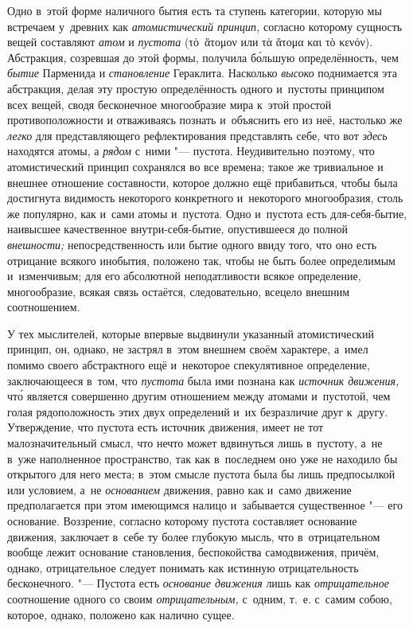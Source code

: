 
Одно в~этой форме наличного бытия есть та ступень категории, которую мы
встречаем у~древних как {\em атомистический принцип,}
согласно которому сущность вещей составляют {\em атом} и {\em пустота}
(\textgreek{τὸ~ἅτομον} или \textgreek{τὰ ἅτομα και τὸ κενόν}).
Абстракция, созревшая до этой формы, получила б\'{о}льшую определённость, чем
{\em бытие} Парменида и {\em становление} Гераклита. Насколько
{\em высоко} поднимается эта абстракция, делая эту
простую определённость одного и~пустоты принципом всех вещей, сводя
бесконечное многообразие мира к~этой простой противоположности и
отваживаясь познать и~объяснить его из неё, настолько же
{\em легко} для представляющего рефлектирования
представлять себе, что вот {\em здесь} находятся атомы,
а {\em рядом} с~ними "--- пустота. Неудивительно поэтому,
что атомистический принцип сохранялся во все времена; такое же тривиальное
и внешнее отношение составности, которое должно ещё прибавиться, чтобы была
достигнута видимость некоторого конкретного и~некоторого многообразия,
столь же популярно, как и~сами атомы и~пустота. Одно и~пустота есть
для-себя-бытие, наивысшее качественное внутри-себя-бытие, опустившееся до
полной {\em внешности;} непосредственность или бытие
одного ввиду того, что оно есть отрицание всякого инобытия, положено так,
чтобы не быть более определимым и~изменчивым; для его абсолютной
неподатливости всякое определение, многообразие, всякая связь остаётся,
следовательно, всецело внешним соотношением.

У тех мыслителей, которые впервые выдвинули указанный атомистический
принцип, он, однако, не застрял в~этом внешнем своём характере, а~имел
помимо своего абстрактного ещё и~некоторое спекулятивное определение,
заключающееся в~том, что {\em пустота} была ими познана
как {\em источник движения,} чт\'{о} является совершенно
другим отношением между атомами и~пустотой, чем голая рядоположность этих
двух определений и~их безразличие друг к~другу. Утверждение, что пустота
есть источник движения, имеет не тот малозначительный смысл, что нечто
может вдвинуться лишь в~пустоту, а~не в~уже наполненное пространство, так
как в~последнем оно уже не находило бы открытого для него места; в~этом
смысле пустота была бы лишь предпосылкой или условием, а~не
{\em основанием} движения, равно как и~само движение
предполагается при этом имеющимся налицо и~забывается существенное "--- его
основание. Воззрение, согласно которому пустота составляет основание
движения, заключает в~себе ту более глубокую мысль, что в~отрицательном
вообще лежит основание становления, беспокойства самодвижения, причём,
однако, отрицательное следует понимать как истинную отрицательность
бесконечного. "--- Пустота есть {\em основание движения}
лишь как {\em отрицательное} соотношение одного со
своим {\em отрицательным,} с~одним, т.~е. с~самим
собою, которое, однако, положено как налично сущее.

